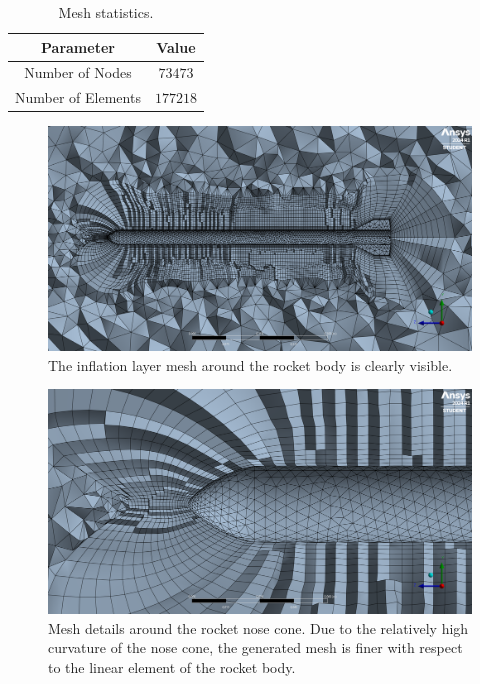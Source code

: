 \begin{table}[H]
    \centering
    \begin{tabular}{|c|c|}
        \hline
        \textbf{Parameter} & \textbf{Value} \\
        \hline
        Number of Nodes    & $73473$        \\
        Number of Elements & $177218$       \\
        \hline
    \end{tabular}
    \caption{Mesh statistics.}
    \label{tab:mesh_statistics}
\end{table}

\begin{figure}[H]
    \centering
    \includegraphics[width=.7\textwidth]{img/PreRunning/Mesh_sectioned.png}
    \caption{The inflation layer mesh around the rocket body is clearly visible.}
    \label{fig:mesh_sectioned}
\end{figure}

\begin{figure}[H]
    \centering
    \includegraphics[width=.7\textwidth]{img/PreRunning/Mesh_sectioned_nose.png}
    \caption{Mesh details around the rocket nose cone. Due to the relatively high curvature of the nose cone, the generated mesh is finer with respect to the linear element of the rocket body.}
    \label{fig:mesh_sectioned_nose}
\end{figure}